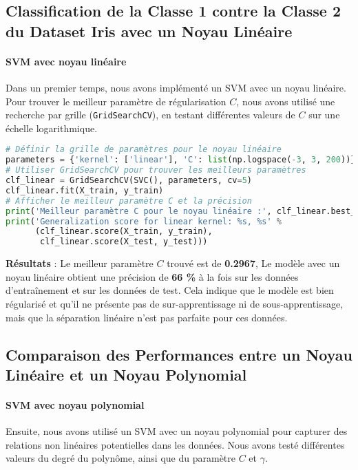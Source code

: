 \documentclass[12pt,a4paper]{report}
\begin{document}
\subsection{Classification de la Classe 1 contre la Classe 2 du Dataset Iris avec un Noyau Linéaire}
\paragraph{SVM avec noyau linéaire\\}
Dans un premier temps, nous avons implémenté un SVM avec un noyau linéaire. Pour trouver le meilleur paramètre de régularisation \( C \), nous avons utilisé une recherche par grille (\texttt{GridSearchCV}), en testant différentes valeurs de \( C \) sur une échelle logarithmique.



\begin{lstlisting}[language=Python, caption=Implémentation du SVM avec noyau linéaire]
# Définir la grille de paramètres pour le noyau linéaire
parameters = {'kernel': ['linear'], 'C': list(np.logspace(-3, 3, 200))}
# Utiliser GridSearchCV pour trouver les meilleurs paramètres
clf_linear = GridSearchCV(SVC(), parameters, cv=5)
clf_linear.fit(X_train, y_train)
# Afficher le meilleur paramètre C et la précision
print('Meilleur paramètre C pour le noyau linéaire :', clf_linear.best_params_)
print('Generalization score for linear kernel: %s, %s' %
      (clf_linear.score(X_train, y_train),
       clf_linear.score(X_test, y_test)))
\end{lstlisting}

\textbf{Résultats} : Le meilleur paramètre \( C \) trouvé est de \textbf{0.2967}, Le modèle avec un noyau linéaire obtient une précision de \textbf{66 \%} à la fois sur les données d'entraînement et sur les données de test. Cela indique que le modèle est bien régularisé et qu'il ne présente pas de sur-apprentissage ni de sous-apprentissage, mais que la séparation linéaire n'est pas parfaite pour ces données. 
\subsection{Comparaison des Performances entre un Noyau Linéaire et un Noyau Polynomial}
\paragraph{SVM avec noyau polynomial\\}
Ensuite, nous avons utilisé un SVM avec un noyau polynomial pour capturer des relations non linéaires potentielles dans les données. Nous avons testé différentes valeurs du degré du polynôme, ainsi que du paramètre \( C \) et \( \gamma \).
\end{document}

